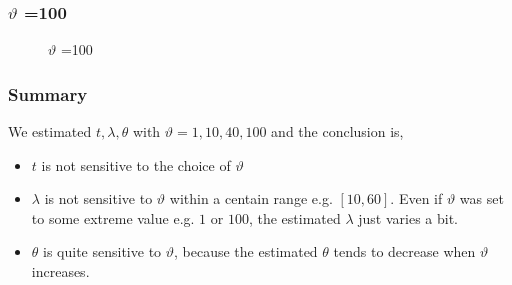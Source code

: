 \documentclass{article}
\begin{document}
\subsubsection{$\vartheta$ =100 }
\begin{figure}[H]
    \centering
    \caption{$\vartheta$ =100}
\end{figure}

\subsubsection{Summary}

We estimated $t,\lambda,\theta$ with $\vartheta = 1,10,40,100$ and the conclusion is,
\begin{itemize}
    \item  $t$ is not sensitive to the choice of $\vartheta$
    \item $\lambda$ is not sensitive to $\vartheta$ within a centain range e.g. $[10,60]$. Even if $\vartheta$ was set to some extreme value e.g. $1$ or $100$, the estimated $\lambda$ just varies a bit.
    \item $\theta$ is quite sensitive to $\vartheta$, because the estimated $\theta$ tends to decrease when $\vartheta$ increases.
\end{itemize}
\end{document}
